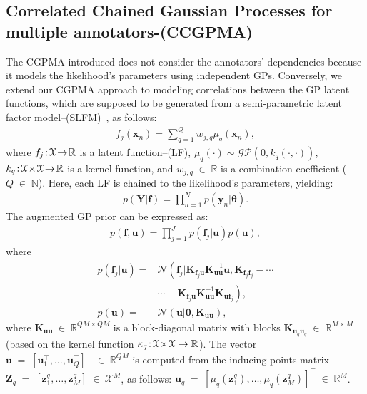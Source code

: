\documentclass[journal]{IEEEtran}
\providecommand{\ve}[1]{{\bm{#1}}}%
\providecommand{\mat}[1]{{\bm{#1}}} %
\newcommand{\Real}{\mathbb{R}}
\DeclareMathOperator{\en}{\!\,\in\!\,}
\DeclareMathOperator{\igual}{\!\,=\!\,}
\providecommand{\s}[1]{\negthinspace#1\negthinspace}%
\providecommand{\ve}[1]{{\mathbf{#1}}}
\providecommand{\mat}[1]{{\mathbf{#1}}}
\newcommand{\gauss}{\mathcal{N}} %
\begin{document}
\subsection{Correlated Chained Gaussian Processes for multiple  annotators-(CCGPMA)} 

The CGPMA introduced does not consider the annotators' dependencies because it models the likelihood's parameters using independent GPs. Conversely, we extend our CGPMA approach to modeling correlations between the GP latent functions, which are supposed to be generated from a semi-parametric latent factor model--(SLFM)~\cite{teh2005semiparametric}, as follows:
\begin{align}
\label{eq:SLFM}
f_j(\ve{x}_n) = \sum_{q=1}^{Q} w_{j,q} \mu_{q}(\ve{x}_n),
\end{align}
where $f_j\s{:}\mathcal{X}\s{\to}\Real$ is a latent function--(LF), $\mu_q(\cdot) \sim \mathcal{GP}(0,{k}_q(\cdot, \cdot))$, ${k}_q\s{:}\mathcal{X}\s{\times}\mathcal{X}\s{\to}\Real$ is a kernel function, and $w_{j,q}\en\Real$ is a combination coefficient ($Q\en\mathbb{N}$). Here, each LF is chained to the likelihood's parameters, yielding:
\begin{align}
p(\mat{Y}|{\ve{f}}) = \prod_{n=1}^{N}p(\ve{y}_n|\bm{\theta}).
\end{align} 
The augmented GP prior can be expressed as:
\begin{align}
\label{eq:CCGPpri}
p({\ve{f}}, {\ve{u}}) = \prod_{j=1}^{J}p(\ve{f}_j|{\ve{u}})p({\ve{u}}),
\end{align}
where
\begin{align}
p(\ve{f}_j|{\ve{u}})=& \gauss\left(\ve{f}_j|\mat{K}_{\ve{f}_j{\ve{u}}}\mat{K}^{-1}_{{\ve{u}}{\ve{u}}}{\ve{u}},\mat{K}_{\ve{f}_j\ve{f}_j}\right.-\cdots \nonumber\\
&\cdots-\left.\mat{K}_{\ve{f}_j{\ve{u}}}\mat{K}^{-1}_{{\ve{u}}{\ve{u}}}\mat{K}_{{\ve{u}}\ve{f}_j}\right),\\
p({\ve{u}}) =& \gauss\left({\ve{u}}| \ve{0}, \mat{K}_{{\ve{u}}{\ve{u}}}\right),
\end{align}
where $\mat{K}_{{\ve{u}}{\ve{u}}} \en \Real^{QM\times QM}$ is a block-diagonal matrix with blocks $\mat{K}_{\ve{u}_q\ve{u}_q}\en \Real^{M\times M}$ (based on the kernel function ${\kappa}_q\s{:}\mathcal{X}\s{\times}\mathcal{X}\to \Real$). The vector ${\ve{u}} \igual \left[\ve{u}_1^{\top}, \dots , \ve{u}_Q^{\top} \right]^{\top} \en \Real^{QM}$ is computed from the inducing points matrix $\mat{Z}_q\igual\left[\ve{z}_1^q, \dots , \ve{z}_M^q\right]\en\mathcal{X}^{M}$, as follows: $\ve{u}_q\igual \left[\mu_q(\ve{z}_1^q), \dots , \mu_q(\ve{z}_M^q)\right]^{\top}\en\Real^{M}$.
\end{document}
